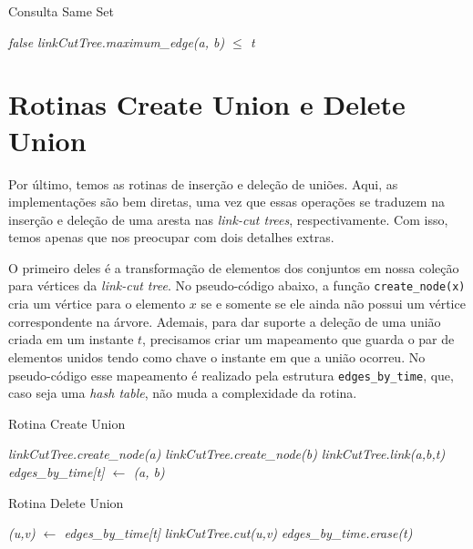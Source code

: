 \begin{algorithm}[h!]
    \caption{Consulta Same Set}\label{uf:same-set}
    \begin{algorithmic}[1]
        \State \Return \emph{false}
        \EndIf
        \State \Return \emph{linkCutTree.maximum\_edge(a, b) $\leq$ t}
        \EndFunction
    \end{algorithmic}
\end{algorithm}

\section{Rotinas Create Union e Delete Union}
\label{sec:uf-union}

Por último, temos as rotinas de inserção e deleção de uniões. Aqui, as implementações são bem diretas, uma vez que essas operações se traduzem na inserção e deleção de uma aresta nas \emph{link-cut trees}, respectivamente. Com isso, temos apenas que nos preocupar com dois detalhes extras.

O primeiro deles é a transformação de elementos dos conjuntos em nossa coleção para vértices da \emph{link-cut tree}. No pseudo-código abaixo, a função \texttt{create\_node(x)} cria um vértice para o elemento $x$ se e somente se ele ainda não possui um vértice correspondente na árvore. Ademais, para dar suporte a deleção de uma união criada em um instante $t$, precisamos criar um mapeamento que guarda o par de elementos unidos tendo como chave o instante em que a união ocorreu. No pseudo-código esse mapeamento é realizado pela estrutura \texttt{edges\_by\_time}, que, caso seja uma \emph{hash table}, não muda a complexidade da rotina.

\begin{algorithm}[h!]
    \caption{Rotina Create Union}\label{uf:create-union}
    \begin{algorithmic}[1]
        \State \emph{linkCutTree.create\_node(a)}
        \State \emph{linkCutTree.create\_node(b)}
        \State \emph{linkCutTree.link(a,b,t)}
        \State \emph{edges\_by\_time[t] $\gets$ (a, b)}
        \EndFunction
    \end{algorithmic}
\end{algorithm}

\begin{algorithm}[h!]
    \caption{Rotina Delete Union}\label{uf:delete-union}
    \begin{algorithmic}[1]
        \State \emph{(u,v) $\gets$ edges\_by\_time[t]}
        \State \emph{linkCutTree.cut(u,v)}
        \State \emph{edges\_by\_time.erase(t)}
        \EndFunction
    \end{algorithmic}
\end{algorithm}

